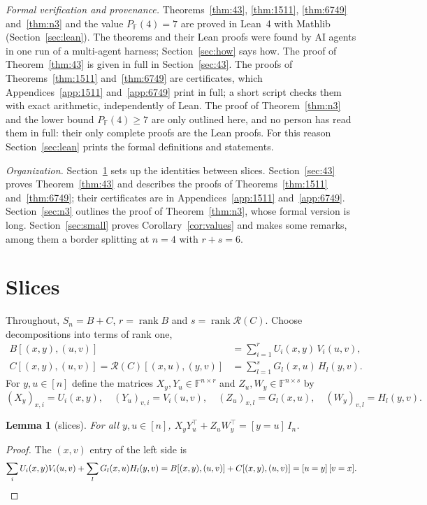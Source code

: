 \documentclass[11pt]{amsart}
\newtheorem{lemma}[theorem]{Lemma}
\theoremstyle{remark}
\newcommand{\F}{\mathbb{F}}
\newcommand{\rk}{\operatorname{rank}}
\newcommand{\R}{\mathcal{R}}
\begin{document}
\emph{Formal verification and provenance.} Theorems~\ref{thm:43}, \ref{thm:1511},
\ref{thm:6749} and~\ref{thm:n3} and the value $P_\F(4)=7$ are proved in Lean~4 with Mathlib (Section~\ref{sec:lean}). The theorems and their Lean proofs
were found by AI agents in one run of a multi-agent harness; Section~\ref{sec:how} says how. The proof of
Theorem~\ref{thm:43} is given in full in Section~\ref{sec:43}. The proofs of Theorems~\ref{thm:1511}
and~\ref{thm:6749} are certificates, which Appendices~\ref{app:1511} and~\ref{app:6749} print in full; a short
script checks them with exact arithmetic, independently of Lean. The proof of Theorem~\ref{thm:n3} and the
lower bound $P_\F(4)\ge7$ are only outlined here, and no person has read them in full: their only complete proofs
are the Lean proofs. For this reason
Section~\ref{sec:lean} prints the formal definitions and statements.

\emph{Organization.} Section~\ref{sec:slices} sets up the identities between slices.
Section~\ref{sec:43} proves Theorem~\ref{thm:43} and describes the proofs of Theorems~\ref{thm:1511}
and~\ref{thm:6749}; their certificates are in Appendices~\ref{app:1511} and~\ref{app:6749}. Section~\ref{sec:n3} outlines the proof of
Theorem~\ref{thm:n3}, whose formal version is long. Section~\ref{sec:small} proves
Corollary~\ref{cor:values} and makes some remarks, among them a border splitting at $n=4$ with $r+s=6$.

\section{Slices}\label{sec:slices}

Throughout, $S_n=B+C$, $r=\rk B$ and $s=\rk\R(C)$. Choose decompositions into terms of rank one,
\begin{align*}
  B[(x,y),(u,v)]&=\sum_{i=1}^{r}U_i(x,y)\,V_i(u,v),\\
  C[(x,y),(u,v)]=\R(C)[(x,u),(y,v)]&=\sum_{l=1}^{s}G_l(x,u)\,H_l(y,v).
\end{align*}
For $y,u\in[n]$ define the matrices $X_y,Y_u\in\F^{n\times r}$ and $Z_u,W_y\in\F^{n\times s}$ by
\[
  (X_y)_{x,i}=U_i(x,y),\quad (Y_u)_{v,i}=V_i(u,v),\quad (Z_u)_{x,l}=G_l(x,u),\quad (W_y)_{v,l}=H_l(y,v).
\]

\begin{lemma}[slices]\label{lem:slices}
For all $y,u\in[n]$, $X_yY_u^{\top}+Z_uW_y^{\top}=[y=u]\,I_n$.
\end{lemma}

\begin{proof}
The $(x,v)$ entry of the left side is
\[
  \sum_{i}U_i(x,y)V_i(u,v)+\sum_{l}G_l(x,u)H_l(y,v)=B[(x,y),(u,v)]+C[(x,y),(u,v)]=[u=y]\,[v=x].
  \qedhere
\]
\end{proof}
\end{document}
